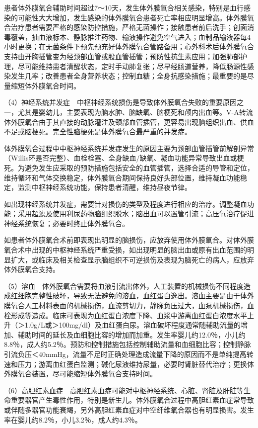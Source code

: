 患者体外膜氧合辅助时间超过7～10天，发生体外膜氧合相关感染，特别是血行感染的可能性大大增加，发生感染的体外膜氧合患者死亡率相应明显增高。体外膜氧合治疗患者需要严格的感染防控措施，严格无菌操作；接触患者前后洗手；创面消毒覆盖，抽血液标本、静脉推注药物、输液操作避免空气进入；血制品输液器每4小时更换；在无菌条件下预先预充好体外膜氧合管路备用；心外科术后体外膜氧合支持由开胸插管变为经颈部血管或股血管插管；预防性抗生素应用；加强肺部护理，尽可能维持患者清醒状态，定时手动肺复张；尽早经肠道营养，降低肠源性感染发生几率；改善患者全身营养状态；控制血糖；全身抗感染措施；最重要的是尽量缩短体外膜氧合时间。

（4）神经系统并发症　中枢神经系统损伤是导致体外膜氧合失败的重要原因之一，尤其是婴幼儿，主要表现为脑水肿、脑缺氧、脑梗死和颅内出血等。V-A转流体外膜氧合由于其直接的动脉灌注及颈部血管插管，更容易出现脑组织出血、供血不足或脑梗死。完全性脑梗死是体外膜氧合最严重的并发症。

体外膜氧合过程中中枢神经系统并发症发生的原因主要为颈部血管插管前解剖异常（Willis环是否完整）、血栓栓塞、全身缺血/缺氧、凝血功能异常导致出血或梗死。为避免发生应采取的预防措施包括安全的血管插管，选择合适的导管和定位，维持循环和气体交换稳定，体外膜氧合期间保持良好头部位置，维持凝血功能稳定，监测中枢神经系统功能，保持患者清醒，维持昼夜节律。

如出现神经系统并发症，需要针对损伤的类型及程度进行相应的治疗。调整凝血功能；采用超滤及使用利尿药物脑组织脱水；脑出血可以置管引流；高压氧治疗促进神经系统恢复；必要时终止体外膜氧合。

如患者体外膜氧合术前即表现出明显的脑损伤，应放弃使用体外膜氧合。对体外膜氧合术中出现的中枢神经系统严重受损，如出现明显的脑出血或原有出血范围的明显扩大，或临床及相关检查显示脑组织不可逆损伤及表现为脑死亡的病人，应放弃体外膜氧合支持。

（5）溶血　体外膜氧合需要将血液引流出体外，人工装置的机械损伤不同程度造成红细胞完整性破坏，导致无法避免的溶血，血红蛋白逸出。溶血主要是由于体外膜氧合人工材料表面的机械损伤，血流剪切力，静脉负压过大，血泵机械损伤，血栓形成等造成。临床可表现为血红蛋白浓度下降、血浆中游离血红蛋白浓度水平上升（＞1.0g/L或＞100mg/dl）及血红蛋白尿。溶血破坏程度通常随辅助流量的增加、辅助时间的延长及血细胞比容的增加而加重。发生率婴儿约12.0％，小儿约8.8％，成人约5.2％。预防和控制措施包括控制辅助流量和血细胞比容；控制静脉引流负压＜40mmHg，流量不足时正确处理造成流量下降的原因而不是单纯提高转速和压力；游离血红蛋白监测；碱化尿液维持尿量，必要时肾脏替代治疗；更换体外膜氧合装置，尽可能缩短体外膜氧合支持时间。

（6）高胆红素血症　高胆红素血症可能对中枢神经系统、心脏、肾脏及肝脏等生命重要器官产生毒性作用，特别是新生儿。体外膜氧合过程中高胆红素血症常导致或伴随多器官功能衰竭，另外高胆红素血症对中空纤维氧合器也有明显损害。发生率在婴儿约8.2％，小儿3.2％，成人约4.3％。


